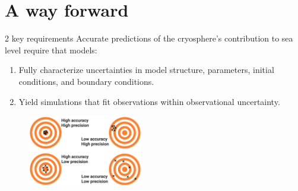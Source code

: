 \documentclass[hide notes,intlimits]{beamer}
\begin{document}
  {
}


\part{A way forward}

\frame{\partpage}

  {
}

\begin{frame}{2 key requirements}
Accurate predictions of the cryosphere's contribution to sea level require that models:
\begin{enumerate}
    \item<1> Fully characterize uncertainties in model structure, parameters, initial conditions, and boundary conditions.
    \item<1-2> Yield simulations that fit observations within observational uncertainty. 
\end{enumerate}
  \begin{figure}
    \includegraphics[width=0.45\textwidth]{difference-accuracy-and-precision}
  \end{figure}
\end{frame}
\end{document}
